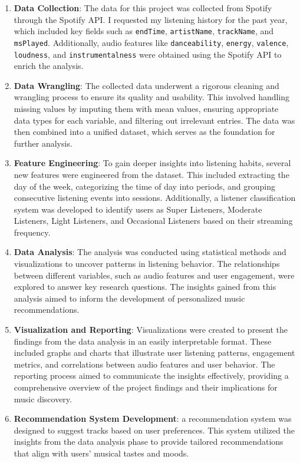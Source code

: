 \documentclass[
]{article}
\begin{document}
\begin{enumerate}
\def\labelenumi{\arabic{enumi}.}
\item
  \textbf{Data Collection}: The data for this project was collected from
  Spotify through the Spotify API. I requested my listening history for
  the past year, which included key fields such as \texttt{endTime},
  \texttt{artistName}, \texttt{trackName}, and \texttt{msPlayed}.
  Additionally, audio features like \texttt{danceability},
  \texttt{energy}, \texttt{valence}, \texttt{loudness}, and
  \texttt{instrumentalness} were obtained using the Spotify API to
  enrich the analysis.
\item
  \textbf{Data Wrangling}: The collected data underwent a rigorous
  cleaning and wrangling process to ensure its quality and usability.
  This involved handling missing values by imputing them with mean
  values, ensuring appropriate data types for each variable, and
  filtering out irrelevant entries. The data was then combined into a
  unified dataset, which serves as the foundation for further analysis.
\item
  \textbf{Feature Engineering}: To gain deeper insights into listening
  habits, several new features were engineered from the dataset. This
  included extracting the day of the week, categorizing the time of day
  into periods, and grouping consecutive listening events into sessions.
  Additionally, a listener classification system was developed to
  identify users as Super Listeners, Moderate Listeners, Light
  Listeners, and Occasional Listeners based on their streaming
  frequency.
\item
  \textbf{Data Analysis}: The analysis was conducted using statistical
  methods and visualizations to uncover patterns in listening behavior.
  The relationships between different variables, such as audio features
  and user engagement, were explored to answer key research questions.
  The insights gained from this analysis aimed to inform the development
  of personalized music recommendations.
\item
  \textbf{Visualization and Reporting}: Visualizations were created to
  present the findings from the data analysis in an easily interpretable
  format. These included graphs and charts that illustrate user
  listening patterns, engagement metrics, and correlations between audio
  features and user behavior. The reporting process aimed to communicate
  the insights effectively, providing a comprehensive overview of the
  project findings and their implications for music discovery.
\item
  \textbf{Recommendation System Development}: a recommendation system
  was designed to suggest tracks based on user preferences. This system
  utilized the insights from the data analysis phase to provide tailored
  recommendations that align with users' musical tastes and moods.
\end{enumerate}
\end{document}
